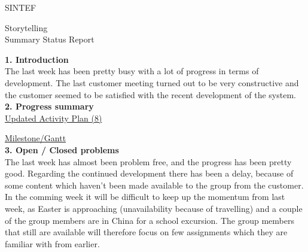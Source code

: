 

\newpage
\thispagestyle{empty}

SINTEF\\
\begin{centering}
Storytelling\\
\huge{Summary Status Report}\\
\end{centering}

\vspace{1cm}
\textbf{1. Introduction}\\

The last week has been pretty busy with a lot of progress in terms of development. The last customer meeting turned out to be very constructive and the customer seemed to be satisfied with the recent development of the system.\\[6pt]

\textbf{2. Progress summary}\\

\href{https://docs.google.com/spreadsheet/ccc?key=0Aigjd3Z4fa8YdGhtR0tqN0d4Q19TR0FmQ2pTVTR1X1E&usp=drive_web#gid=0}{Updated Activity Plan (8)}

\href{https://docs.google.com/spreadsheet/ccc?key=0AlhGbQmvU9bddHl2VWVjWHhiX3VMREc0NWY4UE5hd3c&usp=sharing}{Milestone/Gantt}\\[6pt]

\textbf{3. Open / Closed problems}\\

The last week has almost been problem free, and the progress has been pretty good. Regarding the continued development there has been a delay, because of some content which haven’t been made available to the group from the customer.\\

In the comming week it will be difficult to keep up the momentum from last week, as Easter is approaching (unavailability because of travelling) and a couple of the group members are in China for a school excursion. The group members that still are available will therefore focus on few assignments which they are familiar with from earlier.\\[6pt]

